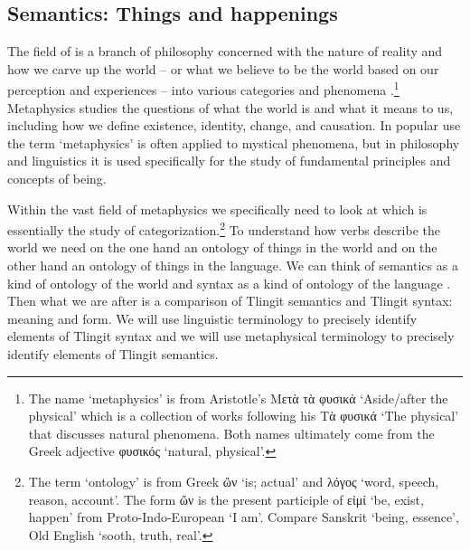 




\subsection{Semantics: Things and happenings}\label{sec:intro-ling-sem}


The field of  is a branch of philosophy concerned with the nature of reality and how we carve up the world – or what we believe to be the world based on our perception and experiences – into various  categories and phenomena \parencite{van-inwagen-sullivan:2015}.\footnote{The name ‘metaphysics’ is from Aristotle’s Μετὰ τὰ φυσικά  ‘Aside/after the physical’ which is a collection of works following his Τὰ φυσικά  ‘The physical’ that discusses natural phenomena. Both names ultimately come from the Greek adjective φυσικός  ‘natural, physical’.} Metaphysics studies the questions of what the world is and what it means to us, including how we define existence, identity, change, and causation. In popular use the term ‘metaphysics’ is often applied to mystical phenomena, but in philosophy and linguistics it is used specifically for the study of fundamental principles and concepts of being.

Within the vast field of metaphysics we specifically need to look at  which is essentially the study of categorization.\footnote{The term ‘ontology’ is from Greek ὤν  ‘is; actual’ and λόγος  ‘word, speech, reason, account’. The form ὤν  is the present participle of εἰμί  ‘be, exist, happen’ from Proto-Indo-European  ‘I am’. Compare Sanskrit  ‘being, essence’, Old English  ‘sooth, truth, real’.} To understand how verbs describe the world we need on the one hand an ontology of things in the world and on the other hand an ontology of things in the language. We can think of semantics as a kind of ontology of the world and syntax as a kind of ontology of the language  \parencites{montague:1969}. Then what we are after is a comparison of Tlingit semantics and Tlingit syntax: meaning and form. We will use linguistic terminology to precisely identify elements of Tlingit syntax and we will use metaphysical terminology to precisely identify elements of Tlingit semantics.

